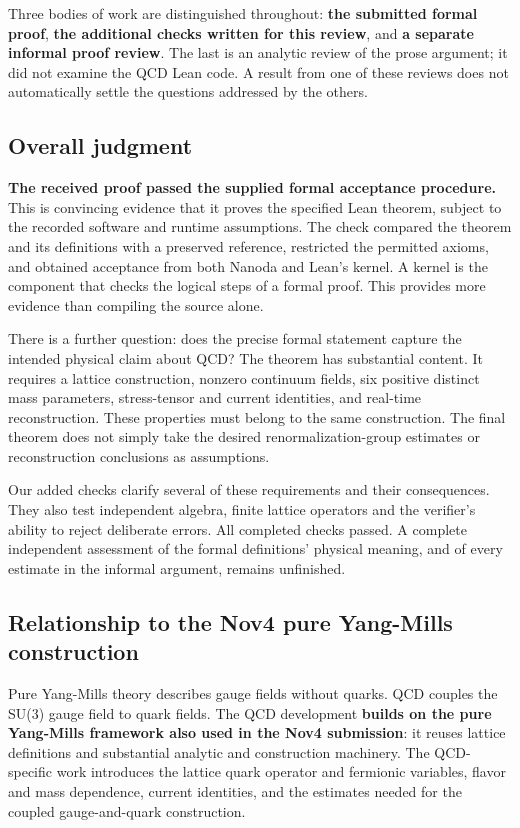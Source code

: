 \documentclass[
  11pt,
]{article}
\begin{document}
Three bodies of work are distinguished throughout: \textbf{the submitted
formal proof}, \textbf{the additional checks written for this review},
and \textbf{a separate informal proof review}. The last is an analytic
review of the prose argument; it did not examine the QCD Lean code. A
result from one of these reviews does not automatically settle the
questions addressed by the others.

\subsection{Overall judgment}\label{overall-judgment}

\textbf{The received proof passed the supplied formal acceptance
procedure.} This is convincing evidence that it proves the specified
Lean theorem, subject to the recorded software and runtime assumptions.
The check compared the theorem and its definitions with a preserved
reference, restricted the permitted axioms, and obtained acceptance from
both Nanoda and Lean's kernel. A kernel is the component that checks the
logical steps of a formal proof. This provides more evidence than
compiling the source alone.

There is a further question: does the precise formal statement capture
the intended physical claim about QCD? The theorem has substantial
content. It requires a lattice construction, nonzero continuum fields,
six positive distinct mass parameters, stress-tensor and current
identities, and real-time reconstruction. These properties must belong
to the same construction. The final theorem does not simply take the
desired renormalization-group estimates or reconstruction conclusions as
assumptions.

Our added checks clarify several of these requirements and their
consequences. They also test independent algebra, finite lattice
operators and the verifier's ability to reject deliberate errors. All
completed checks passed. A complete independent assessment of the formal
definitions' physical meaning, and of every estimate in the informal
argument, remains unfinished.

\subsection{Relationship to the Nov4 pure Yang-Mills
construction}\label{relationship-to-the-nov4-pure-yang-mills-construction}

Pure Yang-Mills theory describes gauge fields without quarks. QCD
couples the SU(3) gauge field to quark fields. The QCD development
\textbf{builds on the pure Yang-Mills framework also used in the Nov4
submission}: it reuses lattice definitions and substantial analytic and
construction machinery. The QCD-specific work introduces the lattice
quark operator and fermionic variables, flavor and mass dependence,
current identities, and the estimates needed for the coupled
gauge-and-quark construction.
\end{document}
